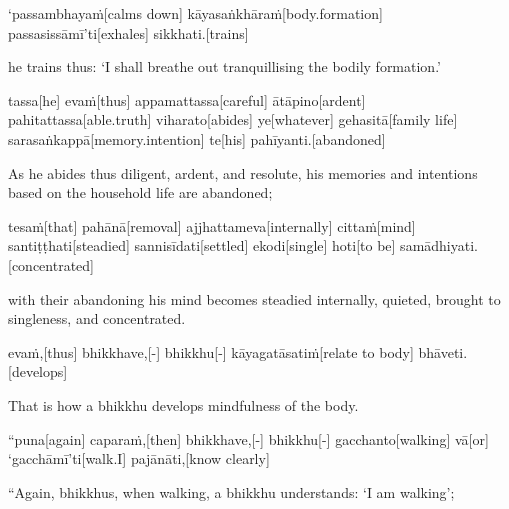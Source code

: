 \begin{samepage}
\begingl[glneveryline={\PaliGlossA,\PaliGlossB}]
‘passambhayaṁ[calms down] kāyasaṅkhāraṁ[body.formation] passasissāmī’ti[exhales] sikkhati.[trains]
\endgl
\nopagebreak
\linespread{0.5}
\begin{spacin}{0.2}
{\PaliGlossFT he trains thus: ‘I shall breathe out tranquillising the bodily formation.’}
\end{spacin}
\vskip 12pt
\end{samepage}
\begin{samepage}
\begingl[glneveryline={\PaliGlossA,\PaliGlossB}]
tassa[he] evaṁ[thus] appamattassa[careful] ātāpino[ardent] pahitattassa[able.truth] viharato[abides] ye[whatever] gehasitā[family life] sarasaṅkappā[memory.intention] te[his] pahīyanti.[abandoned]
\endgl
\nopagebreak
\linespread{0.5}
\begin{spacin}{0.2}
{\PaliGlossFT As he abides thus diligent, ardent, and resolute, his memories and intentions based on the household life are abandoned;}
\end{spacin}
\vskip 12pt
\end{samepage}
\begin{samepage}
\begingl[glneveryline={\PaliGlossA,\PaliGlossB}]
tesaṁ[that] pahānā[removal] ajjhattameva[internally] cittaṁ[mind] santiṭṭhati[steadied] sannisīdati[settled] ekodi[single] hoti[to be] samādhiyati.[concentrated]
\endgl
\nopagebreak
\linespread{0.5}
\begin{spacin}{0.2}
{\PaliGlossFT with their abandoning his mind becomes steadied internally, quieted, brought to singleness, and concentrated.}
\end{spacin}
\vskip 12pt
\end{samepage}
\begin{samepage}
\begingl[glneveryline={\PaliGlossA,\PaliGlossB}]
evaṁ,[thus] bhikkhave,[-] bhikkhu[-] kāyagatāsatiṁ[relate to body] bhāveti.[develops]
\endgl
\nopagebreak
\linespread{0.5}
\begin{spacin}{0.2}
{\PaliGlossFT That is how a bhikkhu develops mindfulness of the body.}
\end{spacin}
\vskip 12pt
\end{samepage}
\vskip 0.05in
\begin{samepage}
\begingl[glneveryline={\PaliGlossA,\PaliGlossB}]
“puna[again] caparaṁ,[then] bhikkhave,[-] bhikkhu[-] gacchanto[walking] vā[or] ‘gacchāmī’ti[walk.I] pajānāti,[know clearly]
\endgl
\nopagebreak
\linespread{0.5}
\begin{spacin}{0.2}
{\PaliGlossFT “Again, bhikkhus, when walking, a bhikkhu understands: ‘I am walking’;}
\end{spacin}
\vskip 12pt
\end{samepage}
